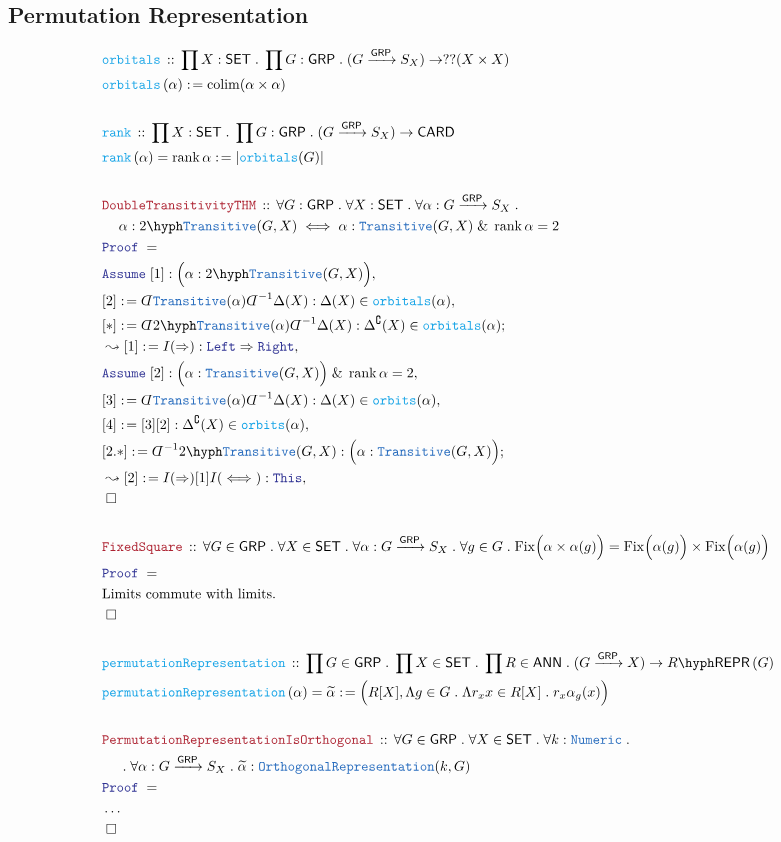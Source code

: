 \documentclass[12pt]{scrartcl}%
\newcommand{\TYPE}[1]{\textcolor{NavyBlue}{\mathtt{#1}}}%
\newcommand{\FUNC}[1]{\textcolor{Cerulean}{\mathtt{#1}}}%
\newcommand{\LOGIC}[1]{\textcolor{Blue}{\mathtt{#1}}}%
\newcommand{\THM}[1]{\textcolor{Maroon}{\mathtt{#1}}}%
\renewcommand{\.}{\; . \;} %
\newcommand{\de}{: \kern 0.1pc =} %
\newcommand{\Act}[1]{\left( #1 \right)} %
\newcommand{\Theorem}[2]{& \THM{#1} \, :: \, #2 \\ & \Proof = \\ } %
\newcommand{\DeclareFunc}[2]{& \FUNC{#1} \, :: \, #2 \\}%
\newcommand{\DefineFunc}[3]{&  \FUNC{#1}\Act{#2} \de #3 \\}%
\newcommand{\DefineNamedFunc}[4]{&  \FUNC{#1}\Act{#2} = #3 \de #4 \\}%
\newcommand{\NewLine}{\\ & \kern 1pc}%
\newcommand{\Page}[1]{ \begin{align*} #1 \end{align*}  }%
\newcommand{ \bd }{ \ByDef }%
\newcommand{\NoProof}{ & \ldots \\ \EndProof}%
\renewcommand{\And}{\; \& \;}%
\newcommand{\Imply}{\Rightarrow}
\renewcommand{\c}{\complement}%
\newcommand{\Say}[3]{& #1 \de #2 : #3, \\} %
\newcommand{\Conclude}[3]{& #1 \de #2 : #3; \\}%
\newcommand{\Derive}[3]{& \leadsto #1 \de #2 : #3, \\} %
\newcommand{\Assume}[2]{& \LOGIC{Assume} \; #1 : #2, \\} %
\newcommand{\QED}{\; \square} %
\newcommand{\EndProof}{& \QED \\} %
\newcommand{\ByDef}{\rotatebox[origin=c]{-180}{$D$}}%
\newcommand{\Proof}{\LOGIC{Proof} \; } %
\newcommand{\Arrow}[1]{\xrightarrow{#1}}%
\DeclareMathOperator*{\colim}{colim}%
\newcommand{\SET}{\mathsf{SET}} %
\DeclareMathOperator{\rank}{rank} %
\newcommand{\GRP}{\mathsf{GRP}} %
\newcommand{\REPR}[2]{#1\hyph\mathsf{REPR}\left(#2\right)}
\newcommand{\ANN}{\mathsf{ANN}} %
\begin{document}
\subsection{Permutation Representation}
\Page{
	\DeclareFunc{orbitals}{ 
		\prod X : \SET \. 
		\prod G : \GRP \.
		(G \Arrow{\GRP} S_X) \to ??(X \times X)
	}
	\DefineFunc{orbitals}{\alpha}{\colim (\alpha \times \alpha)}
	\\
	\DeclareFunc{rank}{\prod X : \SET \. \prod G : \GRP \. (G \Arrow{\GRP} S_X) \to \mathsf{CARD} }
	\DefineNamedFunc{rank}{\alpha}{\rank \alpha}{ |\FUNC{orbitals}(G)| }
	\\
	\Theorem{DoubleTransitivityTHM}
	{
		\forall G : \GRP \.
		\forall X : \SET \.
		\forall \alpha : G \Arrow{\GRP} S_X \.
		\NewLine
		\alpha : 2\hyph\TYPE{Transitive}(G,X) \iff
		\alpha : \TYPE{Transitive}(G,X) \And \rank \alpha = 2
	}
	\Assume{[1]}{\Big( \alpha : 2\hyph\TYPE{Transitive}(G,X) \Big)}
	\Say{[2]}{
		\bd \TYPE{Transitive}(\alpha) \bd^{-1} \Delta(X)	
	}
	{\Delta(X) \in \FUNC{orbitals}(\alpha)}
	\Conclude{[*]}{
		\bd 2\hyph\TYPE{Transitive}(\alpha) \bd^{-1} \Delta(X)
	}
	{
		\Delta^\c(X) \in \FUNC{orbitals}(\alpha)
	}
	\Derive{[1]}{I(\Imply)}
	{
		\LOGIC{Left} \Imply \LOGIC{Right}
	}
	\Assume{[2]}{ \Big( \alpha : \TYPE{Transitive}(G,X) \Big) \And \rank \alpha = 2 } 
	\Say{[3]}{\bd \TYPE{Transitive}(\alpha) \bd^{-1}\Delta(X)}{
		\Delta(X) \in \FUNC{orbits}(\alpha)
	}
	\Say{[4]}{[3][2]}{\Delta^\c(X) \in \FUNC{orbits}(\alpha)}
	\Conclude{[2.*]}{\bd^{-1}2\hyph\TYPE{Transitive}(G,X)}{ \Big( \alpha : \TYPE{Transitive}(G,X)  \Big)  }
	\Derive{[2]}{I(\Imply)[1]I(\iff)}{\LOGIC{This}}
	\EndProof
	\\
	\Theorem{FixedSquare}
	{
		\forall G \in \GRP \.
		\forall X \in \SET \. 
		\forall \alpha : G \Arrow{\GRP} S_X \.
		\forall g \in G \.
		\mathrm{Fix}\Big(\alpha\times\alpha(g)\Big) = 
		\mathrm{Fix}\Big(\alpha(g)\Big) \times \mathrm{Fix}\Big(\alpha(g)\Big)
	}
	& \textrm{Limits commute with limits.} \\                       
	\EndProof
	\\
	\DeclareFunc{permutationRepresentation}
	{
		\prod G \in \GRP \.
		\prod X \in \SET \.
		\prod R \in \ANN \.
		(G \Arrow{\GRP} X) \to \REPR{R}{G}
	}
	\DefineNamedFunc{permutationRepresentation}
	{\alpha }{\widetilde{\alpha}}{\Big( R[X], \Lambda g \in G \. \Lambda  r_x x \in R[X] \. r_x \alpha_g(x) \Big)  }
	\\
	\Theorem{PermutationRepresentationIsOrthogonal}
	{
		\forall G \in \GRP \.
		\forall X \in \SET \.
		\forall k : \TYPE{Numeric} \. \NewLine \. 
		\forall \alpha : G \Arrow{\GRP} S_X \.
		\widetilde{\alpha} : \TYPE{OrthogonalRepresentation}(k,G)
	}
	\NoProof
}
\end{document}
